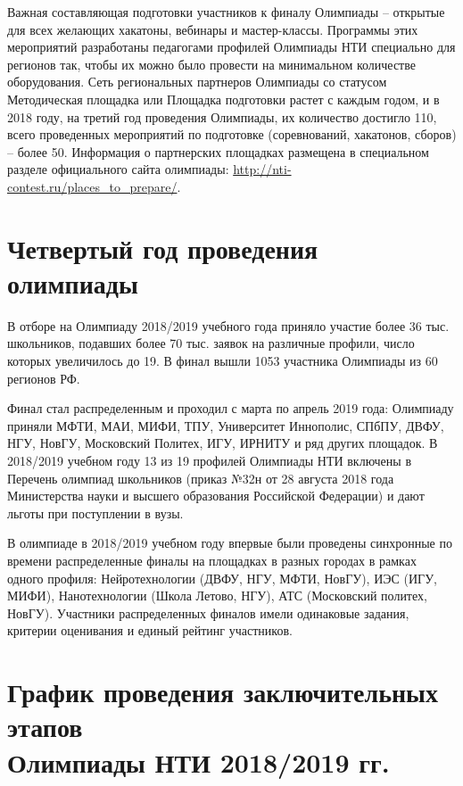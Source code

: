 Важная составляющая подготовки участников к финалу Олимпиады –  открытые для всех желающих хакатоны, вебинары и мастер-классы. Программы этих мероприятий разработаны педагогами профилей Олимпиады НТИ специально для регионов так, чтобы их можно было провести на минимальном количестве оборудования. Сеть региональных партнеров Олимпиады со статусом Методическая площадка или Площадка подготовки растет с каждым годом, и в 2018 году, на третий год проведения Олимпиады, их количество достигло 110, всего проведенных мероприятий по подготовке  (соревнований, хакатонов, сборов) –  более 50. Информация о партнерских площадках размещена в специальном разделе официального сайта олимпиады: \url{http://nti-contest.ru/places_to_prepare/}.

\section*{Четвертый год проведения олимпиады}

В отборе на Олимпиаду 2018/2019 учебного года приняло участие более 36 тыс. школьников, подавших более 70 тыс. заявок на различные профили, число которых увеличилось до 19. В финал вышли 1053 участника Олимпиады из 60 регионов РФ.

Финал стал распределенным и проходил с марта по апрель 2019 года: Олимпиаду приняли МФТИ, МАИ, МИФИ, ТПУ, Университет Иннополис, СПбПУ, ДВФУ, НГУ, НовГУ, Московский Политех, ИГУ, ИРНИТУ и ряд других площадок. В 2018/2019 учебном году 13 из 19 профилей Олимпиады НТИ включены в Перечень олимпиад школьников (приказ №32н от 28 августа 2018 года Министерства науки и высшего образования Российской Федерации) и дают льготы при поступлении в вузы.

В олимпиаде в 2018/2019 учебном году впервые были проведены синхронные по времени распределенные финалы на площадках в разных городах в рамках одного профиля: Нейротехнологии (ДВФУ, НГУ, МФТИ, НовГУ), ИЭС (ИГУ, МИФИ), Нанотехнологии (Школа Летово, НГУ), АТС (Московский политех, НовГУ). Участники распределенных финалов имели одинаковые задания, критерии оценивания и единый рейтинг участников.

\section*{График проведения заключительных этапов\\Олимпиады НТИ 2018/2019 гг.}

